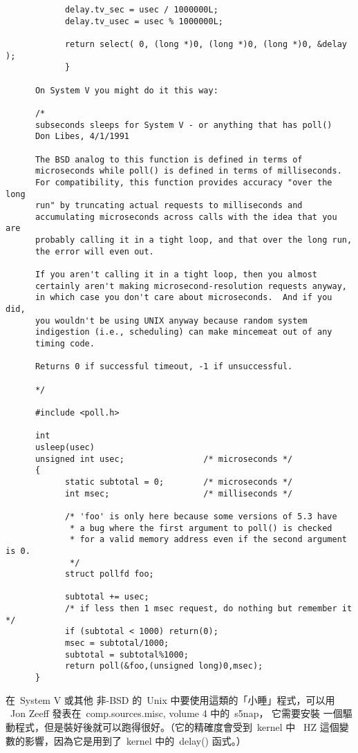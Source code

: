 \documentclass{article}
\begin{document}
\begin{CJK*}{Bg5}{ming}
\begin{verbatim}
            delay.tv_sec = usec / 1000000L;
       	    delay.tv_usec = usec % 1000000L;

            return select( 0, (long *)0, (long *)0, (long *)0, &delay );
       	    }

      On System V you might do it this way:

      /*
      subseconds sleeps for System V - or anything that has poll()
      Don Libes, 4/1/1991

      The BSD analog to this function is defined in terms of
      microseconds while poll() is defined in terms of milliseconds.
      For compatibility, this function provides accuracy "over the long
      run" by truncating actual requests to milliseconds and
      accumulating microseconds across calls with the idea that you are
      probably calling it in a tight loop, and that over the long run,
      the error will even out.

      If you aren't calling it in a tight loop, then you almost
      certainly aren't making microsecond-resolution requests anyway,
      in which case you don't care about microseconds.  And if you did,
      you wouldn't be using UNIX anyway because random system
      indigestion (i.e., scheduling) can make mincemeat out of any
      timing code.

      Returns 0 if successful timeout, -1 if unsuccessful.

      */

      #include <poll.h>

      int
      usleep(usec)
      unsigned int usec;                /* microseconds */
      {
            static subtotal = 0;        /* microseconds */
            int msec;                   /* milliseconds */

            /* 'foo' is only here because some versions of 5.3 have
             * a bug where the first argument to poll() is checked
             * for a valid memory address even if the second argument is 0.
             */
            struct pollfd foo;

            subtotal += usec;
            /* if less then 1 msec request, do nothing but remember it */
            if (subtotal < 1000) return(0);
            msec = subtotal/1000;
            subtotal = subtotal%1000;
            return poll(&foo,(unsigned long)0,msec);
      }
\end{verbatim}
\normalsize
	在~System V 或其他 非-BSD 的~Unix 中要使用這類的「小睡」程式，可以用 
       ~Jon Zeeff 發表在~comp.sources.misc, volume 4 中的~s5nap， 它需要安裝
	一個驅動程式，但是裝好後就可以跑得很好。（它的精確度會受到~kernel 中 
	~HZ 這個變數的影響，因為它是用到了~kernel 中的~delay() 函式。）


\end{CJK*}
\end{document}
